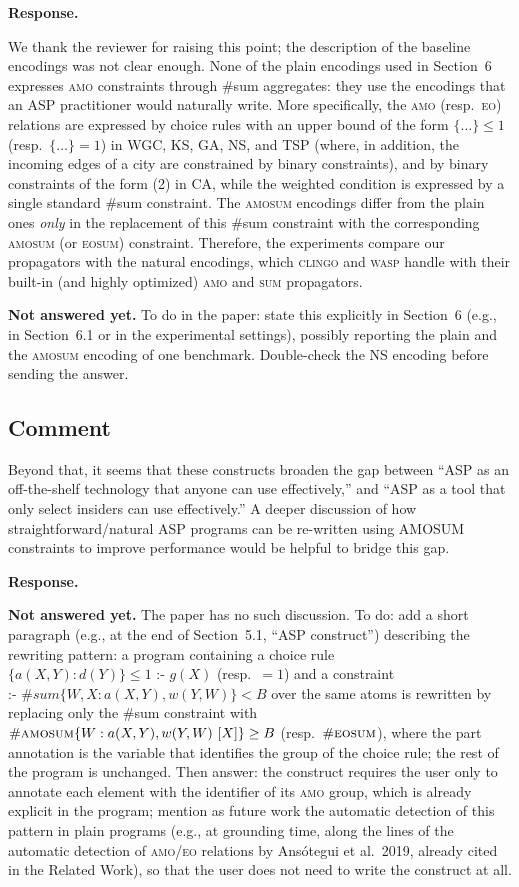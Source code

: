 \documentclass[11pt]{article}
\theoremstyle{definition}
\newcommand{\reviewertodo}{\subsection{\color{red}Comment}}
\newenvironment{response}{
    \color{blue} \textbf{Response.}
}{
}
\newcommand{\notanswered}[1]{{\color{red}\textbf{Not answered yet.} #1}}
\begin{document}
\begin{response}
We thank the reviewer for raising this point; the description of the baseline encodings was not clear enough.
None of the plain encodings used in Section~6 expresses \textsc{amo} constraints through \#sum aggregates: they use the encodings that an ASP practitioner would naturally write.
More specifically, the \textsc{amo} (resp.\ \textsc{eo}) relations are expressed by choice rules with an upper bound of the form $\{ \ldots \} \le 1$ (resp.\ $\{ \ldots \} = 1$) in WGC, KS, GA, NS, and TSP (where, in addition, the incoming edges of a city are constrained by binary constraints), and by binary constraints of the form (2) in CA, while the weighted condition is expressed by a single standard \#sum constraint.
The \textsc{amosum} encodings differ from the plain ones \emph{only} in the replacement of this \#sum constraint with the corresponding \textsc{amosum} (or \textsc{eosum}) constraint.
Therefore, the experiments compare our propagators with the natural encodings, which \textsc{clingo} and \textsc{wasp} handle with their built-in (and highly optimized) \textsc{amo} and \textsc{sum} propagators.

\notanswered{To do in the paper: state this explicitly in Section~6 (e.g., in Section~6.1 or in the experimental settings), possibly reporting the plain and the \textsc{amosum} encoding of one benchmark. Double-check the NS encoding before sending the answer.}
\end{response}

\vspace{0.5cm}
\reviewertodo
Beyond that, it seems that these constructs broaden the gap between ``ASP as an off-the-shelf technology that anyone can use effectively,'' and ``ASP as a tool that only select insiders can use effectively.'' A deeper discussion of how straightforward/natural ASP programs can be re-written using AMOSUM constraints to improve performance would be helpful to bridge this gap.

\begin{response}
\notanswered{The paper has no such discussion.
To do: add a short paragraph (e.g., at the end of Section~5.1, ``ASP construct'') describing the rewriting pattern: a program containing a choice rule $\{ a(X,Y) : d(Y) \} \le 1 \text{ :- } g(X)$ (resp.\ $= 1$) and a constraint $\text{:- } \#\mathit{sum}\{ W,X : a(X,Y), w(Y,W)\} < B$ over the same atoms is rewritten by replacing only the \#sum constraint with $\#\textsc{amosum}\{ W : a(X,Y), w(Y,W)\ [X]\} \ge B$ (resp.\ $\#\textsc{eosum}$), where the part annotation is the variable that identifies the group of the choice rule; the rest of the program is unchanged.
Then answer: the construct requires the user only to annotate each element with the identifier of its \textsc{amo} group, which is already explicit in the program; mention as future work the automatic detection of this pattern in plain programs (e.g., at grounding time, along the lines of the automatic detection of \textsc{amo}/\textsc{eo} relations by Ans\'otegui et al.\ 2019, already cited in the Related Work), so that the user does not need to write the construct at all.}
\end{response}
\end{document}

